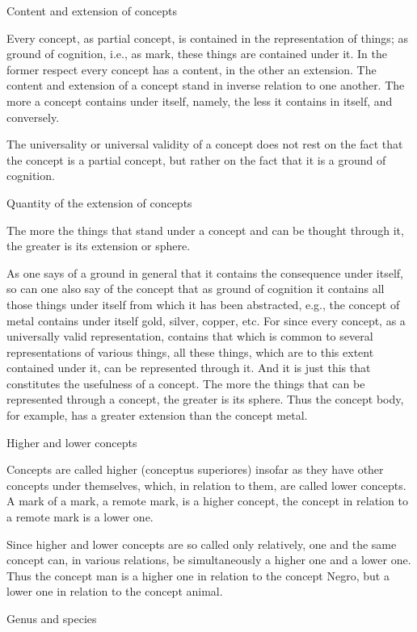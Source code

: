 Content and extension of concepts

Every concept, as partial concept, is contained in the representation of things;
as ground of cognition, i.e., as mark, these things are contained under it.
In the former respect every concept has a content, in the other an extension.
The content and extension of a concept stand in inverse relation to one another.
The more a concept contains under itself, namely,
the less it contains in itself, and conversely.

    The universality or universal validity of a concept does not rest on
    the fact that the concept is a partial concept, but rather on
    the fact that it is a ground of cognition.

Quantity of the extension of concepts

The more the things that stand under a concept and can be thought through it,
the greater is its extension or sphere.

    As one says of a ground in general that it contains the consequence under itself,
    so can one also say of the concept that as ground of cognition it contains
    all those things under itself from which it has been abstracted,
    e.g., the concept of metal contains under itself gold, silver, copper, etc.
    For since every concept, as a universally valid representation, contains
    that which is common to several representations of various things,
    all these things, which are to this extent contained under it,
    can be represented through it.
    And it is just this that constitutes the usefulness of a concept.
    The more the things that can be represented through a concept,
    the greater is its sphere.
    Thus the concept body, for example, has a greater extension
    than the concept metal.

Higher and lower concepts

Concepts are called higher (conceptus superiores) insofar as
they have other concepts under themselves,
which, in relation to them, are called lower concepts.
A mark of a mark, a remote mark, is a higher concept,
the concept in relation to a remote mark is a lower one.

    Since higher and lower concepts are so called only relatively,
    one and the same concept can, in various relations, be simultaneously
    a higher one and a lower one. Thus the concept man is a higher one in
    relation to the concept Negro, but a lower one in relation to the concept
    animal.

Genus and species

